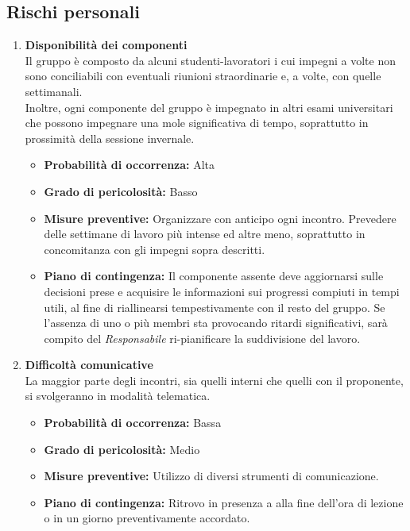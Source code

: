 \subsection{Rischi personali}
\begin{enumerate}
    \item \textbf{Disponibilità dei componenti}\\
    Il gruppo è composto da alcuni studenti-lavoratori i cui impegni a volte non sono conciliabili con eventuali riunioni straordinarie e, a volte, con quelle settimanali.\\
    Inoltre, ogni componente del gruppo è impegnato in altri esami universitari che possono impegnare una mole significativa di tempo, soprattutto in prossimità della sessione invernale.
    \begin{itemize}
        \item \textbf{Probabilità di occorrenza:} Alta
        \item \textbf{Grado di pericolosità:} Basso
        \item \textbf{Misure preventive:} Organizzare con anticipo ogni incontro. Prevedere delle settimane di lavoro più intense ed altre meno, soprattutto in concomitanza con gli impegni sopra descritti.
        \item \textbf{Piano di contingenza:} Il componente assente deve aggiornarsi sulle decisioni prese e acquisire le informazioni sui progressi compiuti in tempi utili, al fine di riallinearsi tempestivamente con il resto del gruppo.
        Se l'assenza di uno o più membri sta provocando ritardi significativi, sarà compito del \textit{Responsabile} ri-pianificare la suddivisione del lavoro.
    \end{itemize}

    \item \textbf{Difficoltà comunicative}\\
    La maggior parte degli incontri, sia quelli interni che quelli con il proponente, si svolgeranno in modalità telematica.
    \begin{itemize}
        \item \textbf{Probabilità di occorrenza:} Bassa
        \item \textbf{Grado di pericolosità:} Medio
        \item \textbf{Misure preventive:} Utilizzo di diversi strumenti di comunicazione.
        \item \textbf{Piano di contingenza:} Ritrovo in presenza a alla fine dell'ora di lezione o in un giorno preventivamente accordato.
    \end{itemize}


\end{enumerate}
